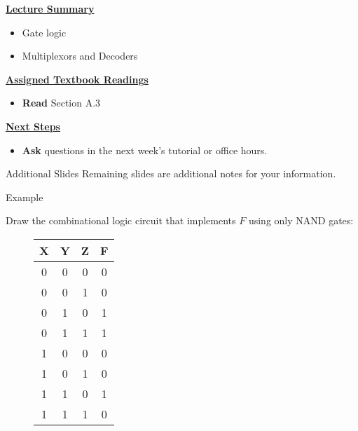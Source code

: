 \begin{frame}[fragile]
 \underline{\textbf{Lecture Summary}}
 \begin{itemize}
 \item Gate logic
 \item Multiplexors and Decoders
 \end{itemize}
 \underline{\textbf{Assigned Textbook Readings}}
\begin{itemize}
     \item \textbf{Read} Section A.3
     \end{itemize}
    \underline{\textbf{Next Steps}}
    \begin{itemize}
    \item \textbf{Ask} questions in the next week's tutorial or office hours.
 \end{itemize}

 \end{frame}


 \begin{frame}{Additional Slides}
     Remaining slides are additional notes for your information.
 \end{frame}

\newpage

 \begin{frame}{Example}
    \begin{tcolorbox}[enhanced,attach boxed title to top center={yshift=-3mm,yshifttext=-1mm},
  colback=red!5!white,colframe=red!75!black,colbacktitle=red!80!black,
  title=Try this,fonttitle=\bfseries,
  boxed title style={size=small,colframe=red!50!black} ]
  Draw the combinational logic circuit that implements $F$ using only NAND gates:  
\begin{figure}[H]
	\begin{center}
		\begin{tabular}{ccc|c}
		X&Y&Z & F\\
		\hline
		0&0&0 & 0\\
		0&0&1 & 0\\
0&1&0 &1\\
0&1&1 & 1\\
\hline
1&0&0 & 0\\
1&0&1 & 0\\
1&1&0 & 1\\
1&1&1 & 0\\
		\end{tabular}
		\end{center}
\end{figure}
\end{tcolorbox}
\end{frame}

